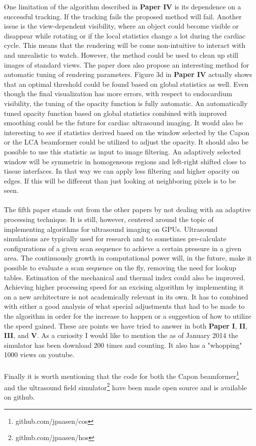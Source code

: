 One limitation of the algorithm described in \textbf{Paper IV} is its dependence on a successful tracking. If the tracking fails the proposed method will fail.  Another issue is the view-dependent visibility, where an object could become visible or disappear while rotating or if the local statistics change a lot during the cardiac cycle. This means that the rendering will be come non-intuitive to interact with and unrealistic to watch. However, the method could be used to clean up still images of standard views. The paper does also propose an interesting method for automatic tuning of rendering parameters. Figure 3d in \textbf{Paper IV} actually shows that an optimal threshold could be found based on global statistics as well. Even though the final visualization has more errors, with respect to endocardium visibility, the tuning of the opacity function is fully automatic. An automatically tuned opacity function based on global statistics combined with improved smoothing could be the future for cardiac ultrasound imaging. It would also be interesting to see if statistics derived based on the window selected by the Capon or the LCA beamformer could be utilized to adjust the opacity. It should also be possible to use this statistic as input to image filtering. An adaptively selected window will be symmetric in homogeneous regions and left-right shifted close to tissue interfaces. In that way we can apply less filtering and higher opacity on edges. If this will be different than just looking at neighboring pixels is to be seen.
\\\\
The fifth paper stands out from the other papers by not dealing with an adaptive processing technique. It is still, however, centered around the topic of implementing algorithms for ultrasound imaging on GPUs. Ultrasound simulations are typically used for research and to sometimes pre-calculate configurations of a given scan sequence to achieve a certain pressure in a given area. The continuously growth in computational power will, in the future, make it possible to evaluate a scan sequence on the fly, removing the need for lookup tables. Estimation of the mechanical and thermal index could also be improved. Achieving higher processing speed for an excising algorithm by implementing it on a new architecture is not academically relevant in its own. It has to combined with either a good analysis of what special adjustments that had to be made to the algorithm in order for the increase to happen or a suggestion of how to utilize the speed gained. These are points we have tried to answer in both \textbf{Paper I}, \textbf{II},  \textbf{III}, and \textbf{V}.  As a curiosity I would like to mention the as of January 2014 the simulator has been download 200 times and counting. It also has a "whopping" 1000 views on youtube. 
\\\\
Finally it is worth mentioning that the code for both the Capon beamformer\footnote{github.com/jpaasen/cos} and the ultrasound field simulator\footnote{github.com/jpaasen/hos} have been made open source and is available on github. 
\endinput